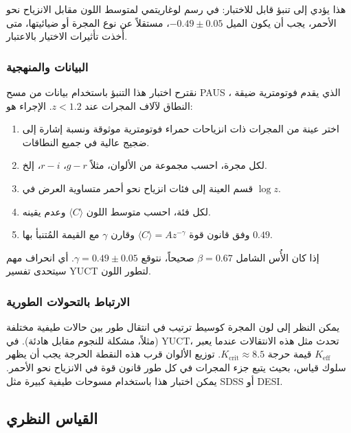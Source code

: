 \documentclass[12pt,a4paper]{article}
\begin{document}
	هذا يؤدي إلى تنبؤ قابل للاختبار: في رسم لوغاريتمي لمتوسط اللون مقابل الانزياح نحو الأحمر، يجب أن يكون الميل \(-0.49 \pm 0.05\)، مستقلاً عن نوع المجرة أو ضيائيتها، متى أُخذت تأثيرات الاختيار بالاعتبار.
	
	\subsubsection{البيانات والمنهجية}
	
	نقترح اختبار هذا التنبؤ باستخدام بيانات من مسح PAUS \cite{Alarcon2019}، الذي يقدم فوتومترية ضيقة النطاق لآلاف المجرات عند \(z < 1.2\). الإجراء هو:
	\begin{enumerate}
		\item اختر عينة من المجرات ذات انزياحات حمراء فوتومترية موثوقة ونسبة إشارة إلى ضجيج عالية في جميع النطاقات.
		\item لكل مجرة، احسب مجموعة من الألوان، مثلاً \(g-r\)، \(r-i\)، إلخ.
		\item قسم العينة إلى فئات انزياح نحو أحمر متساوية العرض في \(\log z\).
		\item لكل فئة، احسب متوسط اللون \(\langle C \rangle\) وعدم يقينه.
		\item وفق قانون قوة \(\langle C \rangle = A z^{-\gamma}\) وقارن \(\gamma\) مع القيمة المُتنبأ بها \(0.49\).
	\end{enumerate}
	
	إذا كان الأُس الشامل \(\beta = 0.67\) صحيحاً، نتوقع \(\gamma = 0.49 \pm 0.05\). أي انحراف مهم سيتحدى تفسير YUCT لتطور اللون.
	
	\subsubsection{الارتباط بالتحولات الطورية}
	
	يمكن النظر إلى لون المجرة كوسيط ترتيب في انتقال طور بين حالات طيفية مختلفة (مثلاً، مشكلة للنجوم مقابل هادئة). في YUCT، تحدث مثل هذه الانتقالات عندما يعبر \(K_{\mathrm{eff}}\) قيمة حرجة \(K_{\mathrm{crit}} \approx 8.5\). توزيع الألوان قرب هذه النقطة الحرجة يجب أن يظهر سلوك قياس، بحيث يتبع جزء المجرات في كل طور قانون قوة في الانزياح نحو الأحمر. يمكن اختبار هذا باستخدام مسوحات طيفية كبيرة مثل SDSS أو DESI.
	
	\subsection{القياس النظري}
	
\end{document}
